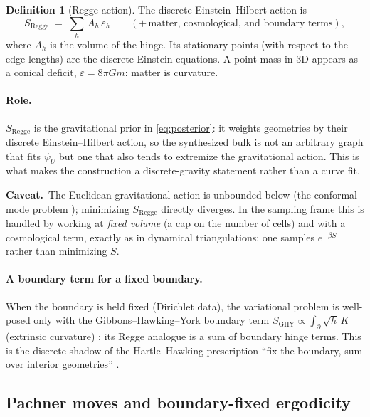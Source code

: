 \documentclass[11pt]{article}
\newcommand{\bd}{\partial}
\theoremstyle{definition}
\newtheorem{definition}{Definition}[section]
\theoremstyle{plain}
\newcommand{\caveat}[1]{\par\noindent\textcolor{red!60!black}{\textbf{Caveat.}}\ #1\par}
\begin{document}
\begin{definition}[Regge action]
The discrete Einstein--Hilbert action is
\begin{equation}
S_{\mathrm{Regge}} \;=\; \sum_{h}\, A_h\,\varepsilon_h
\qquad(+\,\text{matter, cosmological, and boundary terms}),
\label{eq:reggeaction}
\end{equation}
where $A_h$ is the volume of the hinge. Its stationary points (with respect to the edge
lengths) are the discrete Einstein equations. A point mass in $3$D appears as a conical
deficit, $\varepsilon=8\pi G m$: matter is curvature.
\end{definition}

\paragraph{Role.} $S_{\mathrm{Regge}}$ is the gravitational prior in \eqref{eq:posterior}:
it weights geometries by their discrete Einstein--Hilbert action, so the synthesized bulk is
not an arbitrary graph that fits $\psi_U$ but one that also tends to extremize the
gravitational action. This is what makes the construction a discrete-gravity statement
rather than a curve fit.

\caveat{The Euclidean gravitational action is unbounded below (the conformal-mode problem
\cite{gibbons1978}); minimizing $S_{\mathrm{Regge}}$ directly diverges. In the sampling
frame this is handled by working at \emph{fixed volume} (a cap on the number of cells) and
with a cosmological term, exactly as in dynamical triangulations; one samples $e^{-\beta
S}$ rather than minimizing $S$.}

\paragraph{A boundary term for a fixed boundary.}
When the boundary is held fixed (Dirichlet data), the variational problem is well-posed only
with the Gibbons--Hawking--York boundary term $S_{\mathrm{GHY}}\propto\int_{\bd}\sqrt{h}\,K$
(extrinsic curvature) \cite{gibbons1977}; its Regge analogue is a sum of boundary hinge
terms. This is the discrete shadow of the Hartle--Hawking prescription ``fix the boundary,
sum over interior geometries'' \cite{hartle1983}.

\subsection{Pachner moves and boundary-fixed ergodicity}
\label{sec:pachner}
\end{document}
